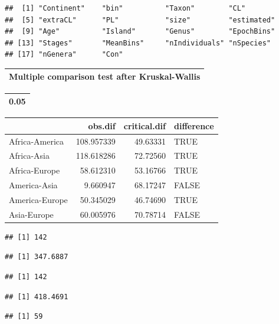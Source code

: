 \documentclass[]{article}
\begin{document}
\begin{verbatim}
##  [1] "Continent"    "bin"          "Taxon"        "CL"          
##  [5] "extraCL"      "PL"           "size"         "estimated"   
##  [9] "Age"          "Island"       "Genus"        "EpochBins"   
## [13] "Stages"       "MeanBins"     "nIndividuals" "nSpecies"    
## [17] "nGenera"      "Con"
\end{verbatim}

\begin{table}

\centering
\begin{tabular}[t]{l}
\hline
Multiple comparison test after Kruskal-Wallis\\
\hline
\end{tabular}
\centering
\begin{tabular}[t]{r}
\hline
0.05\\
\hline
\end{tabular}
\centering
\begin{tabular}[t]{l|r|r|l}
\hline
  & obs.dif & critical.dif & difference\\
\hline
Africa-America & 108.957339 & 49.63331 & TRUE\\
\hline
Africa-Asia & 118.618286 & 72.72560 & TRUE\\
\hline
Africa-Europe & 58.612310 & 53.16766 & TRUE\\
\hline
America-Asia & 9.660947 & 68.17247 & FALSE\\
\hline
America-Europe & 50.345029 & 46.74690 & TRUE\\
\hline
Asia-Europe & 60.005976 & 70.78714 & FALSE\\
\hline
\end{tabular}
\end{table}

\begin{verbatim}
## [1] 142
\end{verbatim}

\begin{verbatim}
## [1] 347.6887
\end{verbatim}

\begin{verbatim}
## [1] 142
\end{verbatim}

\begin{verbatim}
## [1] 418.4691
\end{verbatim}

\begin{verbatim}
## [1] 59
\end{verbatim}
\end{document}
